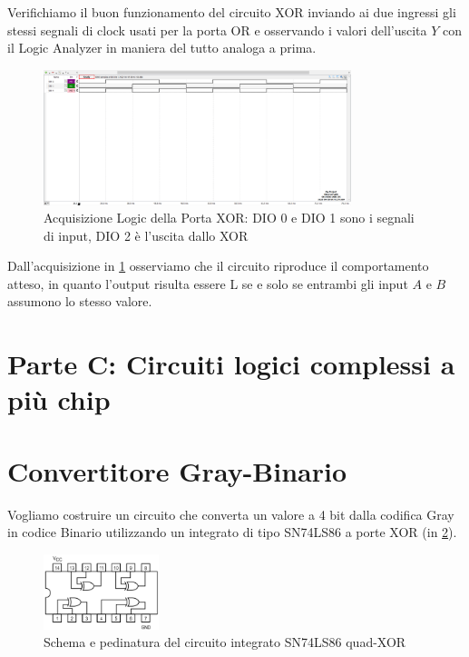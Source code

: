 \documentclass[10pt, a4paper, italian]{article}
\begin{document}
Verifichiamo il buon funzionamento del circuito XOR inviando ai due
ingressi gli stessi segnali di clock usati per la porta OR e osservando i
valori dell'uscita $Y$ con il Logic Analyzer in maniera del tutto analoga a
prima.
\begin{figure}[htbp]
    \centering
    \includegraphics[width=0.8\textwidth]{xor_time}
    \caption{Acquisizione Logic della Porta XOR: DIO 0 e DIO 1 sono i segnali
    di input, DIO 2 è l'uscita dallo XOR}
    \label{fig: XOR_time}
\end{figure}
Dall'acquisizione in \ref{fig: XOR_time} osserviamo che il circuito riproduce
il comportamento atteso, in quanto l'output risulta essere L se e solo se
entrambi gli input $A$ e $B$ assumono lo stesso valore.

\setcounter{section}{5}
\section*{Parte C: Circuiti logici complessi a più chip}
\section{Convertitore Gray-Binario}
Vogliamo costruire un circuito che converta un valore a 4 bit dalla codifica
Gray in codice Binario utilizzando un integrato di tipo SN74LS86 a porte XOR
(in \cref{fig: XOR}).
\begin{figure}[htbp]
    \includegraphics[width=0.3\textwidth]{XOR}
    \caption{Schema e pedinatura del circuito integrato SN74LS86 quad-XOR
    \label{fig: XOR}}
\end{figure}
\end{document}
